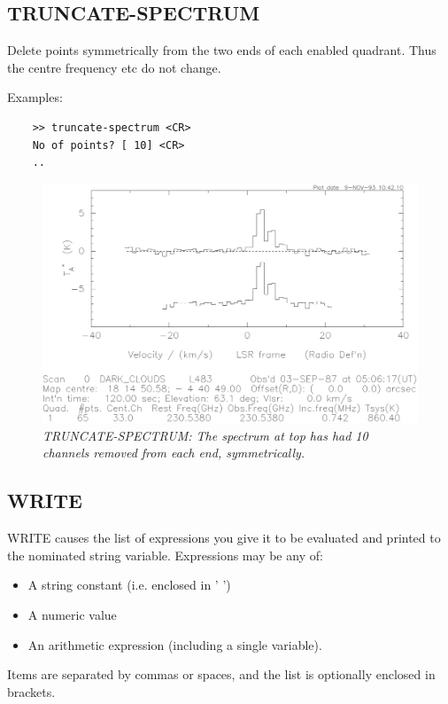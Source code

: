 \documentclass[11pt,twoside]{report}
\begin{document}
\subsection{TRUNCATE-SPECTRUM} 

Delete points symmetrically from the two ends of each enabled quadrant.
Thus the centre frequency etc do not change.

Examples:
\begin{verbatim}
    >> truncate-spectrum <CR>
    No of points? [ 10] <CR>
    ..
\end{verbatim}

\begin{figure}[htbp]
\begin{center}
\includegraphics[scale=0.65]{truncate.ps}
\protect\parbox{5.5in}
{\caption[TRUNCATE]
{\sl
TRUNCATE-SPECTRUM: The spectrum at top has had 10 channels removed from
{\em each} end, symmetrically.
\label{TRUNCATE}
}
}
\end{center}
\end{figure}

\subsection{WRITE}

WRITE causes the list of expressions you give it to be evaluated and printed to
the nominated string variable. Expressions may be any of:
\begin{itemize}
\item    A string constant (i.e. enclosed in ' ')
\item    A numeric value
\item    An arithmetic expression (including a single variable).
\end{itemize}
Items are separated by commas or spaces, and the list is optionally enclosed
in brackets.
\end{document}
